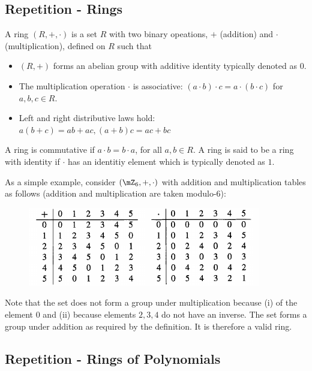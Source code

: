 
\subsection{Repetition - Rings}

\begin{definition}
  A ring $(R,+,\cdot)$ is a set $R$ with two binary opeations, $+$ (addition) and $\cdot$ (multiplication), defined on $R$ such that

  \begin{itemize}
    \item $(R,+)$ forms an abelian group with additive identity typically denoted as $0$.
    \item The multiplication operation $\cdot$ is associative: $(a \cdot b) \cdot c = a \cdot (b \cdot c)$ for $a,b,c \in R$.
    \item Left and right distributive laws hold: $a(b+c) = ab + ac, (a+b)c = ac + bc$
  \end{itemize}
%
  A ring is commutative if $a \cdot b = b \cdot a$, for all $a,b \in R$. A ring is said to be a ring with identity if $\cdot$ has an identitiy element which is typically denoted as $1$.

\end{definition}

As a simple example, consider $(\mZ_6, +, \cdot)$ with addition and multiplication tables as follows (addition and multiplication are taken modulo-6):

\begin{figure}[H]
  \includegraphics[scale=0.75]{images/cyclic_codes_01.png}
\end{figure}

Note that the set does not form a group under multiplication because (i) of the element $0$ and (ii) because elements $2,3,4$ do not have an inverse. The set forms a group under addition as required by the definition. It is therefore a valid ring.


\subsection{Repetition - Rings of Polynomials}

